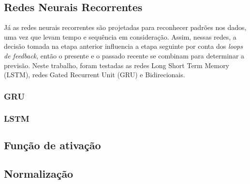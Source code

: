         
\subsection{Redes Neurais Recorrentes}
  
Já as redes neurais recorrentes são projetadas para reconhecer padrões nos dados, uma vez que levam tempo e sequência em consideração. Assim, nessas redes, a decisão tomada na etapa anterior influencia a etapa seguinte por conta dos \textit{loops de feedback}, então o presente e o passado recente se combinam para determinar a previsão. Neste trabalho, foram testadas as redes Long Short Term Memory (LSTM), redes Gated Recurrent Unit (GRU) e Bidirecionais.
  
\subsubsection{GRU}

\subsubsection{LSTM}

\subsection{Função de ativação}


\subsection{Normalização}